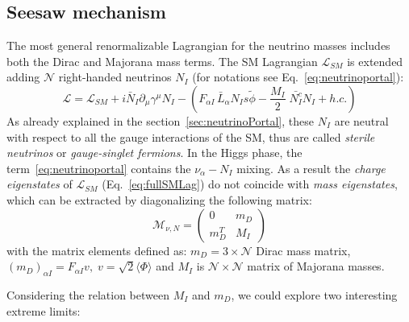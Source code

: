\subsection{Seesaw mechanism}\label{sec:seesaw}
The most general renormalizable Lagrangian for the neutrino masses includes both the Dirac and Majorana mass terms. The SM Lagrangian $\mathcal{L}_{SM}$ is extended adding $\mathcal{N}$ right-handed neutrinos $N_I$ (for notations see Eq.~\ref{eq:neutrinoportal}):
\begin{equation}
\label{eq:fullSMLag}
 \mathcal{L} = \mathcal{L}_{SM}+ i \bar N_I \partial_\mu \gamma^\mu N_I -
  \left(F_{\alpha I} \,\bar L_\alpha N_Is \tilde \phi 
    - \frac{M_I}{2} \; \bar {N_I^c} N_I + h.c.\right)
\end{equation}
As already explained in the section~\ref{sec:neutrinoPortal}, these $N_I$ are neutral with respect to all the gauge interactions of the SM, thus are called \emph{sterile neutrinos} or \emph{gauge-singlet fermions}.
In the Higgs phase, the term~\ref{eq:neutrinoportal} contains the $\nu_{\alpha} - N_I$ mixing. As a result the \emph{charge eigenstates} of $\mathcal{L}_{SM}$ (Eq.~\ref{eq:fullSMLag}) do not coincide with \emph{mass eigenstates}, which can be extracted by diagonalizing the following matrix:
\begin{equation}
\label{eq:matrixmass}
 \mathcal{M}_{\nu,N} = 
\begin{pmatrix}
0 & m_D\\
m^{T}_{D} & M_I
\end{pmatrix}
\end{equation}
with the matrix elements defined as: $m_D = 3 \times  \mathcal{N}$ Dirac mass matrix, $(m_D)_{\alpha I} = F_{\alpha I}v, \; v = \sqrt{2}\langle \Phi \rangle$ and $M_I$ is $\mathcal{N} \times \mathcal{N}$ matrix of Majorana masses.

Considering the relation between $M_I$ and $m_D$, we could explore two interesting extreme limits:
